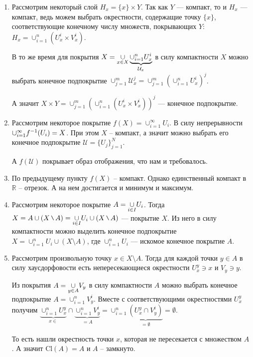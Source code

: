 \begin{Proof}
    \begin{enumerate}
        \item Рассмотрим некоторый слой $H_x = \{x\} \times Y$. Так как $Y$ --- компакт, то и $H_x$ --- компакт, ведь можем выбрать окрестности, содержащие точку $\{x\}$, соответствующие конечному числу множеств, покрывающих $Y$: $H_x = \cup_{i=1}^n (U_x^i \times V_x^i)$. 

        В то же время для покрытия $X = \underset{\tiny x\in X}{\cup} \underbrace{\cup_{i=1}^n U_x^i}_{\mathcal{U}_x}$ в силу компактности $X$ можно выбрать конечное подпокрытие $\cup_{j=1}^m \mathcal{U}_x^j = \cup_{j=1}^m (\cup_{i=1}^n U_x^i)^j$. 

            А значит  $X\times Y = \cup_{j=1}^m (\cup_{i=1}^n (U_x^i \times V_x^i))^j$ --- конечное подпокрытие.
    \item Рассмотрим некоторое покрытие $f(X) = \cup_{i=1}^\infty U_i$. В силу непрерывности $\cup_{i=1}^\infty f^{-1}(U_i) = X$. При этом $X$ -- компакт, а значит можно выбрать его конечное подпокрытие $\mathcal{U} = \{ U_j \}_{j=1}^{N}$. 

        А $f(\mathcal{U} )$ покрывает образ отображения, что нам и требовалось.
    \item По предыдущему пункту  $f(X)$ -- компакт. Однако единственный компакт в $\mathbb{R}$ -- отрезок. А на нем достигается и минимум и максимум.
    \item Рассмотрим некоторое покрытие $A = \underset{\tiny i \in I}{\cup} U_i$. Тогда  $X = A \cup (X \setminus A) = \underset{\tiny i \in I}{\cup} U_i \cup (X\setminus A)$ --- покрытие $X$. Из него в силу компактности можно выделить конечное подпокрытие $X = \cup_{i=1}^n U_i \cup (X\setminus A)$, где $\cup_{i=1}^n U_i$ --- искомое конечное покрытие $A$.
    \item Рассмотрим произвольную точку $x\in X \setminus A$. Тогда для каждой точки $y\in A$ в силу хаусдорфовости есть непересекающиеся окрестности $U_x^y \ni x$ и  $V_y \ni y$. 

        Из покрытия $A = \underset{\tiny y\in A}{\cup} V_y$ в силу компактности $A$ можно выбрать конечное подпокрытие $A = \cup_{i=1}^n V_y^i$. Вместе с соответствующими окрестностями $U_x^y$ получим $\underbrace{\cup_{i=1}^n U_x^y}_{x \in} \cap \underbrace{\cup_{i=1}^n V_y^i}_{=A} = \cup_{i=1}^n \underbrace{(U_x^y \cap V_y^i)}_{=\emptyset} = \emptyset$.

        То есть нашли окрестность точки $x$, которая не пересекается с множеством $A$. А значит $\mathrm{Cl}(A) = A$ и $A$ -- замкнуто.
    \end{enumerate}
\end{Proof}

